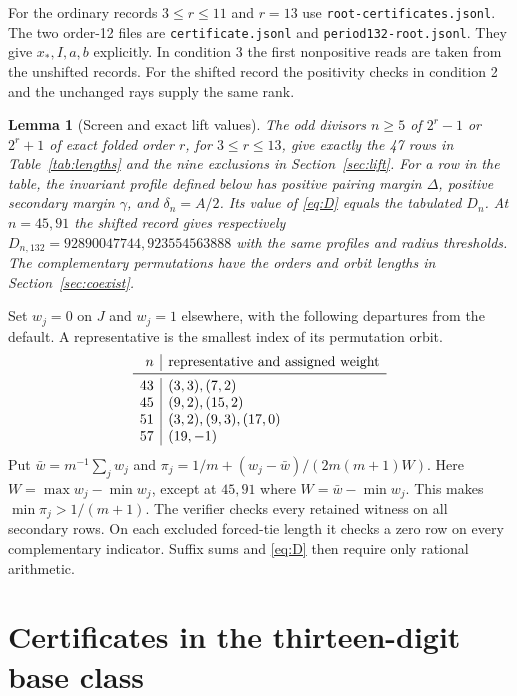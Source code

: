\documentclass[11pt,reqno]{amsart}
\newtheorem{lemma}[theorem]{Lemma}
\theoremstyle{remark}
\newcommand{\file}[1]{\nolinkurl{#1}}
\begin{document}
For the ordinary records \(3\le r\le11\) and \(r=13\)
use \file{root-certificates.jsonl}. The two order-12 files are
\file{certificate.jsonl} and \file{period132-root.jsonl}.
They give \(x_*,I,a,b\) explicitly. In condition 3 the first
nonpositive reads are taken from the unshifted records. For the
shifted record the positivity checks in condition 2 and the
unchanged rays supply the same rank.

\begin{lemma}[Screen and exact lift values]\label{lem:compscreen}
The odd divisors \(n\ge5\) of \(2^r-1\) or \(2^r+1\) of
exact folded order \(r\), for \(3\le r\le13\), give exactly
the 47 rows in Table~\ref{tab:lengths} and the nine exclusions
in Section~\ref{sec:lift}. For a row in the table, the
invariant profile defined below has positive pairing margin
\(\Delta\), positive secondary margin \(\gamma\), and
\(\delta_n=A/2\). Its value of \eqref{eq:D} equals the tabulated \(D_n\).
At \(n=45,91\) the shifted record gives respectively
\(D_{n,132}=92890047744,923554563888\) with the same profiles
and radius thresholds. The complementary permutations have
the orders and orbit lengths in Section~\ref{sec:coexist}.
\end{lemma}

Set \(w_j=0\) on \(J\) and \(w_j=1\) elsewhere, with
the following departures from the default. A representative
is the smallest index of its permutation orbit.
\[
\begin{array}{r|l}
n&\text{representative and assigned weight}\\
\midrule
43 & (3,3),(7,2)\\
45 & (9,2),(15,2)\\
51 & (3,2),(9,3),(17,0)\\
57 & (19,-1)
\end{array}
\]
Put \(\bar w=m^{-1}\sum_j w_j\) and
\(\pi_j=1/m+(w_j-\bar w)/(2m(m+1)W)\).
Here \(W=\max w_j-\min w_j\), except at \(45,91\) where
\(W=\bar w-\min w_j\). This makes
\(\min\pi_j>1/(m+1)\). The verifier checks every retained
witness on all secondary rows. On each excluded forced-tie
length it checks a zero row on every complementary indicator.
Suffix sums and \eqref{eq:D} then require only rational arithmetic.

\section{Certificates in the thirteen-digit base class}\label{app:13}
\end{document}
